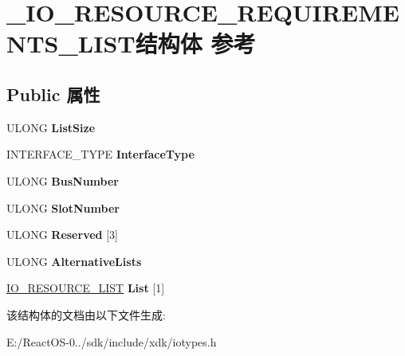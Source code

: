 \hypertarget{struct___i_o___r_e_s_o_u_r_c_e___r_e_q_u_i_r_e_m_e_n_t_s___l_i_s_t}{}\section{\+\_\+\+I\+O\+\_\+\+R\+E\+S\+O\+U\+R\+C\+E\+\_\+\+R\+E\+Q\+U\+I\+R\+E\+M\+E\+N\+T\+S\+\_\+\+L\+I\+S\+T结构体 参考}
\label{struct___i_o___r_e_s_o_u_r_c_e___r_e_q_u_i_r_e_m_e_n_t_s___l_i_s_t}
\subsection*{Public 属性}
\begin{DoxyCompactItemize}
\item 
\mbox{\label{struct___i_o___r_e_s_o_u_r_c_e___r_e_q_u_i_r_e_m_e_n_t_s___l_i_s_t_a75d5e97f2a2065baf247bc5647448609}} 
U\+L\+O\+NG {\bfseries List\+Size}
\item 
\mbox{\label{struct___i_o___r_e_s_o_u_r_c_e___r_e_q_u_i_r_e_m_e_n_t_s___l_i_s_t_a284d7c8cf7e657a5d59ba4554b7ab60a}} 
I\+N\+T\+E\+R\+F\+A\+C\+E\+\_\+\+T\+Y\+PE {\bfseries Interface\+Type}
\item 
\mbox{\label{struct___i_o___r_e_s_o_u_r_c_e___r_e_q_u_i_r_e_m_e_n_t_s___l_i_s_t_aec6d76ca6c87257b3f510ca049d9fad7}} 
U\+L\+O\+NG {\bfseries Bus\+Number}
\item 
\mbox{\label{struct___i_o___r_e_s_o_u_r_c_e___r_e_q_u_i_r_e_m_e_n_t_s___l_i_s_t_a36bcf27c142c034518b4c2f34f7d577e}} 
U\+L\+O\+NG {\bfseries Slot\+Number}
\item 
\mbox{\label{struct___i_o___r_e_s_o_u_r_c_e___r_e_q_u_i_r_e_m_e_n_t_s___l_i_s_t_a12748399e719c0d9aa86400747c417b2}} 
U\+L\+O\+NG {\bfseries Reserved} \mbox{[}3\mbox{]}
\item 
\mbox{\label{struct___i_o___r_e_s_o_u_r_c_e___r_e_q_u_i_r_e_m_e_n_t_s___l_i_s_t_a4aa47573d3c5a0475e2638d362340d21}} 
U\+L\+O\+NG {\bfseries Alternative\+Lists}
\item 
\mbox{\label{struct___i_o___r_e_s_o_u_r_c_e___r_e_q_u_i_r_e_m_e_n_t_s___l_i_s_t_af1d7323c387ce01d54795372a4e19653}} 
\hyperlink{struct___i_o___r_e_s_o_u_r_c_e___l_i_s_t}{I\+O\+\_\+\+R\+E\+S\+O\+U\+R\+C\+E\+\_\+\+L\+I\+ST} {\bfseries List} \mbox{[}1\mbox{]}
\end{DoxyCompactItemize}


该结构体的文档由以下文件生成\+:\begin{DoxyCompactItemize}
\item 
E\+:/\+React\+O\+S-\/0../sdk/include/xdk/iotypes.\+h\end{DoxyCompactItemize}
